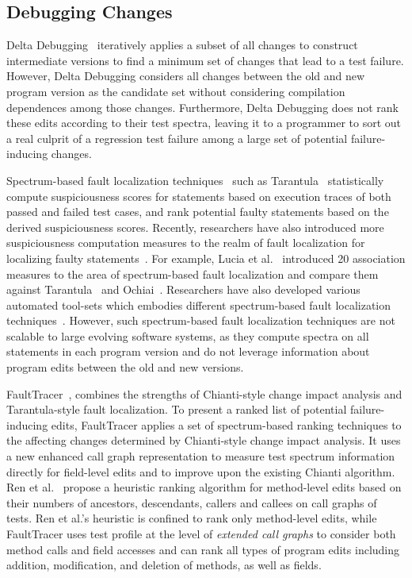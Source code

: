 \documentclass[runningheads,a4paper]{llncs}
\begin{document}
\subsection{Debugging Changes} 
Delta Debugging~\cite{Zeller1999,zeller01} iteratively applies a subset of all changes to
construct intermediate versions to find a minimum set of changes that lead to
a test failure. However, Delta Debugging considers all changes between
the old and new program version as the candidate set without considering compilation dependences among those changes. Furthermore,
Delta Debugging does not rank these edits according to their test spectra, leaving it to a
programmer to sort out a real culprit of a regression test failure among a
large set of potential failure-inducing changes.

Spectrum-based fault localization techniques~\cite{hao2005similarity,Hao:com09,harrold05tarantula,Abreu:testing07,Baudry:icse06,liblit05,Yanbing:icse08, abreu2009practical} such as Tarantula~\cite{Jones2002:tarantula} statistically compute suspiciousness scores for statements based on execution traces of both passed and failed test cases, and rank potential faulty statements based on the derived suspiciousness scores. Recently, researchers have also introduced more suspiciousness computation measures to the realm of fault localization for localizing faulty statements~\cite{naish2011model, lo2010comprehensive}. For example, Lucia et al.~\cite{lo2010comprehensive} introduced 20 association measures to the area of spectrum-based fault localization and compare them against Tarantula~\cite{Jones2002:tarantula} and Ochiai~\cite{Abreu:testing07}. Researchers have also developed various automated tool-sets which embodies different spectrum-based fault localization techniques~\cite{tarantula-url, janssen2009zoltar}. However, such spectrum-based fault localization techniques are not scalable to large evolving software systems, as they compute spectra on all statements in each program version and do not leverage information about program edits between the old and new versions.

FaultTracer~\cite{zhang2011localizing}, combines the strengths of Chianti-style change impact analysis and Tarantula-style fault localization. To present a ranked list of potential failure-inducing edits, FaultTracer applies a set of spectrum-based ranking techniques to the affecting changes determined by Chianti-style change impact analysis. It uses a new enhanced call graph representation to measure test spectrum information directly for field-level edits and to improve upon the existing Chianti algorithm. Ren et al.~\cite{Ren2007} propose a heuristic ranking algorithm for method-level edits based on their numbers of ancestors, descendants, callers and callees on call graphs of tests. Ren et al.'s heuristic is confined to rank only method-level edits, while FaultTracer uses test profile at the level of {\em extended call graphs} to consider both method calls and field accesses and can rank all types of program edits including addition, modification, and deletion of methods, as well as fields.  
\end{document}
